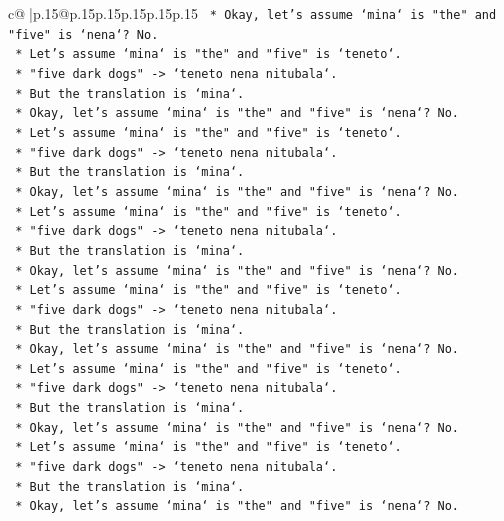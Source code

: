\documentclass{article}
\begin{document}
{\begin{supertabular}{c@{$\;$}|p{.15\linewidth}@{}p{.15\linewidth}p{.15\linewidth}p{.15\linewidth}p{.15\linewidth}p{.15\linewidth}}
{{{\texttt{    *   Okay, let's assume `mina` is "the" and "five" is `nena`? No.} \\
\texttt{    *   Let's assume `mina` is "the" and "five" is `teneto`.} \\
\texttt{    *   "five dark dogs" {-}> `teneto nena nitubala`.} \\
\texttt{    *   But the translation is `mina`.} \\
\texttt{    *   Okay, let's assume `mina` is "the" and "five" is `nena`? No.} \\
\texttt{    *   Let's assume `mina` is "the" and "five" is `teneto`.} \\
\texttt{    *   "five dark dogs" {-}> `teneto nena nitubala`.} \\
\texttt{    *   But the translation is `mina`.} \\
\texttt{    *   Okay, let's assume `mina` is "the" and "five" is `nena`? No.} \\
\texttt{    *   Let's assume `mina` is "the" and "five" is `teneto`.} \\
\texttt{    *   "five dark dogs" {-}> `teneto nena nitubala`.} \\
\texttt{    *   But the translation is `mina`.} \\
\texttt{    *   Okay, let's assume `mina` is "the" and "five" is `nena`? No.} \\
\texttt{    *   Let's assume `mina` is "the" and "five" is `teneto`.} \\
\texttt{    *   "five dark dogs" {-}> `teneto nena nitubala`.} \\
\texttt{    *   But the translation is `mina`.} \\
\texttt{    *   Okay, let's assume `mina` is "the" and "five" is `nena`? No.} \\
\texttt{    *   Let's assume `mina` is "the" and "five" is `teneto`.} \\
\texttt{    *   "five dark dogs" {-}> `teneto nena nitubala`.} \\
\texttt{    *   But the translation is `mina`.} \\
\texttt{    *   Okay, let's assume `mina` is "the" and "five" is `nena`? No.} \\
\texttt{    *   Let's assume `mina` is "the" and "five" is `teneto`.} \\
\texttt{    *   "five dark dogs" {-}> `teneto nena nitubala`.} \\
\texttt{    *   But the translation is `mina`.} \\
\texttt{    *   Okay, let's assume `mina` is "the" and "five" is `nena`? No.} \\
}}}
\end{supertabular}}
\end{document}
